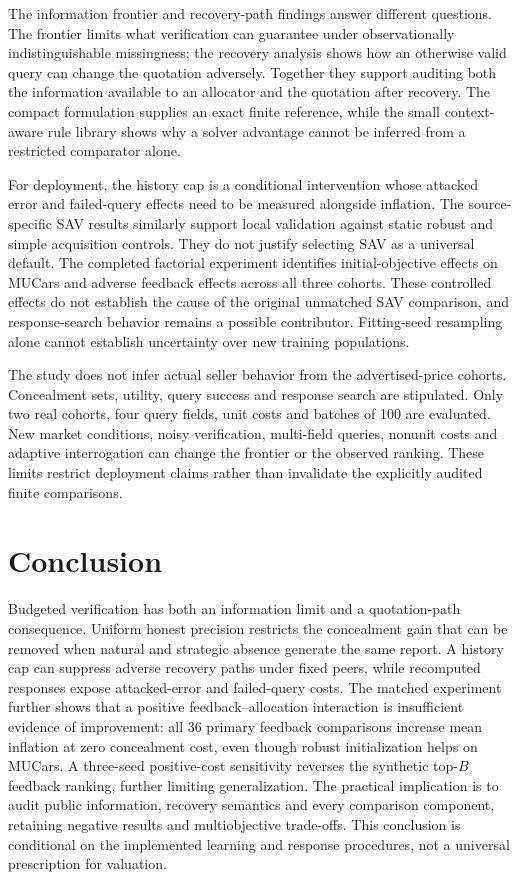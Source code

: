 \documentclass[11pt]{article}
\begin{document}
The information frontier and recovery-path findings answer different questions.
The frontier limits what verification can guarantee under observationally
indistinguishable missingness; the recovery analysis shows how an otherwise
valid query can change the quotation adversely. Together they support auditing
both the information available to an allocator and the quotation after recovery.
The compact formulation supplies an exact finite reference, while the small
context-aware rule library shows why a solver advantage cannot be inferred
from a restricted comparator alone.

For deployment, the history cap is a conditional intervention whose attacked
error and failed-query effects need to be measured alongside inflation. The
source-specific SAV results similarly support local validation against static
robust and simple acquisition controls. They do not justify selecting SAV as
a universal default. The completed factorial experiment identifies initial-objective
effects on MUCars and adverse feedback effects across all three cohorts.
These controlled effects do not establish the cause of the original unmatched
SAV comparison, and response-search behavior remains a possible contributor. Fitting-seed resampling alone cannot establish uncertainty over
new training populations.


The study does not infer actual seller behavior from the advertised-price
cohorts. Concealment sets, utility, query success and response search are
stipulated. Only two real cohorts, four query fields, unit costs and batches
of 100 are evaluated. New market conditions, noisy verification, multi-field
queries, nonunit costs and adaptive interrogation can change the frontier or
the observed ranking. These limits restrict deployment claims rather than
invalidate the explicitly audited finite comparisons.

\section{Conclusion}\label{sec:conclusion}
Budgeted verification has both an information limit and a quotation-path
consequence. Uniform honest precision restricts the concealment gain that can
be removed when natural and strategic absence generate the same report. A
history cap can suppress adverse recovery paths under fixed peers, while
recomputed responses expose attacked-error and failed-query costs. The matched
experiment further shows that a positive feedback--allocation interaction is
insufficient evidence of improvement: all 36 primary feedback comparisons
increase mean inflation at zero concealment cost, even though robust initialization helps on MUCars. A three-seed positive-cost sensitivity reverses the synthetic top-$B$ feedback ranking, further limiting generalization. The practical implication is to audit public information, recovery
semantics and every comparison component, retaining negative results and
multiobjective trade-offs. This conclusion is conditional on the implemented
learning and response procedures, not a universal prescription for valuation.
\end{document}
